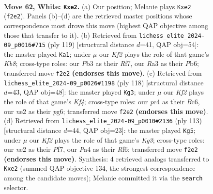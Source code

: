 \documentclass[11pt]{article}
\begin{document}
\clearpage

\begin{figure}[p]\centering
\begin{subfigure}{0.46\textwidth}\centering
\resizebox{\linewidth}{!}{%
\newchessgame
\chessboard[
  setfen={8/p5k1/1p6/2q5/P1p5/RP6/4nK2/8 w - - 6 62},
  showmover=false,
  pgfstyle=straightmove, color=movearrow, markmove={f2-e2}
]}
\caption{}
\end{subfigure}\hfill
\begin{subfigure}{0.46\textwidth}\centering
\resizebox{\linewidth}{!}{%
\newchessgame
\chessboard[
  setfen={8/p4r2/1p6/3p1r2/5P2/2KQP3/8/1k6 b - - 3 60},
  showmover=false,
  pgfstyle=straightmove, color=movearrow, markmove={b1-a1}
]}
\caption{}
\end{subfigure}
\\[4pt]
\begin{subfigure}{0.46\textwidth}\centering
\resizebox{\linewidth}{!}{%
\newchessgame
\chessboard[
  setfen={8/8/2B2qp1/3P3p/3k1KP1/7P/8/8 w - - 1 60},
  showmover=false,
  pgfstyle=straightmove, color=movearrow, markmove={f4-g3}
]}
\caption{}
\end{subfigure}\hfill
\begin{subfigure}{0.46\textwidth}\centering
\resizebox{\linewidth}{!}{%
\newchessgame
\chessboard[
  setfen={8/5p2/3p1rk1/3P3P/3Q4/5P2/4K3/8 b - - 0 57},
  showmover=false,
  pgfstyle=straightmove, color=movearrow, markmove={g6-g5}
]}
\caption{}
\end{subfigure}
\caption{\textbf{Move 62, White: \texttt{Kxe2}.} (a) Our position; Melanie plays \texttt{Kxe2} (\texttt{f2e2}). Panels (b)--(d) are the retrieved master positions whose correspondence most drove this move (highest QAP objective among those that transfer to it). (b) Retrieved from \texttt{lichess\_elite\_2024-09\_p0016\#715} (ply 119) [structural distance $d$=41, QAP obj=54]: the master played \texttt{Ka1}; under $\mu$ our \emph{Kf2} plays the role of that game's \emph{Kb8}; cross-type roles: our \emph{P}b3 as their \emph{R}f7, our \emph{R}a3 as their \emph{P}b6; transferred move \texttt{f2e2} \textbf{(endorses this move)}. (c) Retrieved from \texttt{lichess\_elite\_2024-09\_p0026\#1198} (ply 118) [structural distance $d$=43, QAP obj=48]: the master played \texttt{Kg3}; under $\mu$ our \emph{Kf2} plays the role of that game's \emph{Kf4}; cross-type roles: our \emph{p}c4 as their \emph{B}c6, our \emph{n}e2 as their \emph{p}g6; transferred move \texttt{f2e2} \textbf{(endorses this move)}. (d) Retrieved from \texttt{lichess\_elite\_2024-09\_p0010\#2136} (ply 113) [structural distance $d$=44, QAP obj=23]: the master played \texttt{Kg5}; under $\mu$ our \emph{Kf2} plays the role of that game's \emph{Kg3}; cross-type roles: our \emph{n}e2 as their \emph{P}f7, our \emph{P}a4 as their \emph{R}f6; transferred move \texttt{f2e2} \textbf{(endorses this move)}. Synthesis: 4 retrieved analogs transferred to \texttt{Kxe2} (summed QAP objective 134, the strongest correspondence among the candidate moves); Melanie committed it via the \texttt{search} selector.}
\label{fig:thought-m122}
\end{figure}
\end{document}
